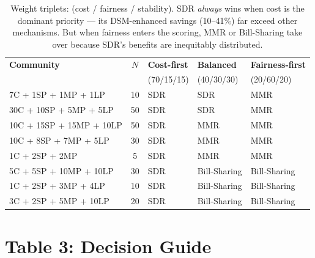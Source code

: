 \documentclass[11pt]{article}
\begin{document}
\begin{table}[h!]
\centering
\renewcommand{\arraystretch}{1.4}
\small
\begin{tabular}{L{4cm} c l l l}
\toprule
\textbf{Community} & $N$ & \textbf{Cost-first} & \textbf{Balanced} & \textbf{Fairness-first} \\
 & & {\scriptsize(70/15/15)} & {\scriptsize(40/30/30)} & {\scriptsize(20/60/20)} \\
\midrule
7C + 1SP + 1MP + 1LP & 10 & SDR & SDR & MMR \\
30C + 10SP + 5MP + 5LP & 50 & SDR & SDR & MMR \\
10C + 15SP + 15MP + 10LP & 50 & SDR & MMR & MMR \\
10C + 8SP + 7MP + 5LP & 30 & SDR & MMR & MMR \\
1C + 2SP + 2MP & 5 & SDR & MMR & MMR \\
5C + 5SP + 10MP + 10LP & 30 & SDR & Bill-Sharing & Bill-Sharing \\
1C + 2SP + 3MP + 4LP & 10 & SDR & Bill-Sharing & Bill-Sharing \\
3C + 2SP + 5MP + 10LP & 20 & SDR & Bill-Sharing & Bill-Sharing \\
\bottomrule
\end{tabular}
\caption*{Weight triplets: (cost / fairness / stability). SDR \emph{always} wins when cost is the dominant priority --- its DSM-enhanced savings (10--41\%) far exceed other mechanisms. But when fairness enters the scoring, MMR or Bill-Sharing take over because SDR's benefits are inequitably distributed.}
\end{table}

\vspace{0.8cm}

\section*{Table 3: Decision Guide}
\end{document}
